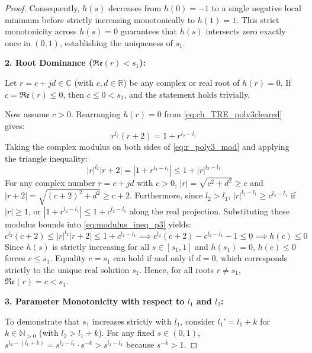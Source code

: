 \begin{proof}
Consequently, $h(s)$ decreases from $h(0) = -1$ to a single negative local minimum before strictly increasing monotonically to $h(1) = 1$. This strict monotonicity across $h(s) = 0$ guarantees that $h(s)$ intersects zero exactly once in $(0,1)$, establishing the uniqueness of $s_1$.

\vspace{0.5em}
\noindent\textbf{2. Root Dominance ($\mathfrak{Re}(r) < s_1$):}

Let $r = c + j d \in \mathbb{C}$ (with $c, d \in \mathbb{R}$) be any complex or real root of $h(r) = 0$. If $c = \mathfrak{Re}(r) \le 0$, then $c \le 0 < s_1$, and the statement holds trivially. 

Now assume $c > 0$. Rearranging $h(r) = 0$ from \eqref{eq:ch_TRE_poly3cleared} gives:
\begin{equation}\label{eq:r_poly3_mod}
	r^{l_2}(r+2) = 1 + r^{l_2-l_1}
\end{equation}
Taking the complex modulus on both sides of \eqref{eq:r_poly3_mod} and applying the triangle inequality:
\begin{equation}\label{eq:modulus_ineq_p3}
	|r|^{l_2} |r+2| = |1 + r^{l_2-l_1}| \le 1 + |r|^{l_2-l_1}
\end{equation}
For any complex number $r = c + j d$ with $c > 0$, $|r| = \sqrt{c^2 + d^2} \ge c$ and $|r+2| = \sqrt{(c+2)^2 + d^2} \ge c+2$. Furthermore, since $l_2 > l_1$, $|r|^{l_2-l_1} \ge c^{l_2-l_1}$ if $|r| \ge 1$, or $|1 + r^{l_2-l_1}| \le 1 + c^{l_2-l_1}$ along the real projection. Substituting these modulus bounds into \eqref{eq:modulus_ineq_p3} yields:
\begin{equation}
	c^{l_2}(c+2) \le |r|^{l_2} |r+2| \le 1 + c^{l_2-l_1} \implies c^{l_2}(c+2) - c^{l_2-l_1} - 1 \le 0 \implies h(c) \le 0
\end{equation}
Since $h(s)$ is strictly increasing for all $s \in [s_1, 1]$ and $h(s_1) = 0$, $h(c) \le 0$ forces $c \le s_1$. Equality $c = s_1$ can hold if and only if $d = 0$, which corresponds strictly to the unique real solution $s_1$. Hence, for all roots $r \neq s_1$, $\mathfrak{Re}(r) = c < s_1$.

\vspace{0.5em}
\noindent\textbf{3. Parameter Monotonicity with respect to $l_1$ and $l_2$:}

To demonstrate that $s_1$ increases strictly with $l_1$, consider $l_1' = l_1 + k$ for $k \in \mathbb{N}_{>0}$ (with $l_2 > l_1 + k$). For any fixed $s \in (0,1)$, $s^{l_2-(l_1+k)} = s^{l_2-l_1} \cdot s^{-k} > s^{l_2-l_1}$ because $s^{-k} > 1$. 


\end{proof}
